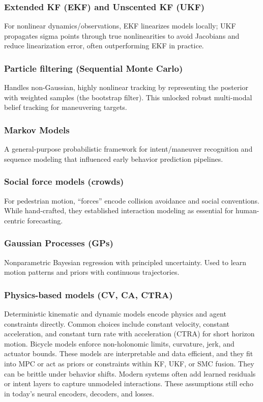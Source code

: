 \documentclass[12pt,a4paper]{report}
\begin{document}
\subsubsection{Extended KF (EKF) and Unscented KF (UKF)}
\quad For nonlinear dynamics/observations, EKF linearizes models locally; UKF propagates sigma points through true nonlinearities to avoid Jacobians and reduce linearization error, often outperforming EKF in practice. \cite{WanMerwe2000UKF}

\subsubsection{Particle filtering (Sequential Monte Carlo)}
\quad Handles non-Gaussian, highly nonlinear tracking by representing the posterior with weighted samples (the bootstrap filter). This unlocked robust multi-modal belief tracking for maneuvering targets. \cite{Gordon1993Bootstrap}

\subsubsection{Markov Models}
\quad A general-purpose probabilistic framework for intent/maneuver recognition and sequence modeling that influenced early behavior prediction pipelines. \cite{Rabiner1989HMM}

\subsubsection{Social force models (crowds)}
\quad For pedestrian motion, “forces” encode collision avoidance and social conventions. While hand-crafted, they established interaction modeling as essential for human-centric forecasting. \cite{Helbing1995SocialForce}

\subsubsection{Gaussian Processes (GPs)}
\quad Nonparametric Bayesian regression with principled uncertainty. Used to learn motion patterns and priors with continuous trajectories. \cite{RasmussenWilliams2006GPML}

\subsubsection{Physics-based models (CV, CA, CTRA)}
\quad Deterministic kinematic and dynamic models encode physics and agent constraints directly. Common choices include constant velocity, constant acceleration, and constant turn rate with acceleration (CTRA) for short horizon motion. Bicycle models enforce non-holonomic limits, curvature, jerk, and actuator bounds. These models are interpretable and data efficient, and they fit into MPC or act as priors or constraints within KF, UKF, or SMC fusion. They can be brittle under behavior shifts. Modern systems often add learned residuals or intent layers to capture unmodeled interactions.
These assumptions still echo in today’s neural encoders, decoders, and losses.
\end{document}
